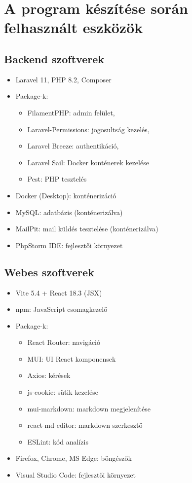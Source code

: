 \section{A program készítése során felhasznált eszközök}
\label{sec:softwares}

\subsection{Backend szoftverek}

\begin{itemize}
    \item Laravel 11, PHP 8.2, Composer
    \item Package-k: 
    \begin{itemize}
        \item FilamentPHP: admin felület,
        \item Laravel-Permissions: jogosultság kezelés,
        \item Laravel Breeze: authentikáció,
        \item Laravel Sail: Docker konténerek kezelése
        \item Pest: PHP tesztelés
    \end{itemize}
    \item Docker (Desktop): konténerizáció
    \item MySQL: adatbázis (konténerizálva)
    \item MailPit: mail küldés tesztelése (konténerizálva)
    \item PhpStorm IDE: fejlesztői környezet
\end{itemize}

\subsection{Webes szoftverek}

\begin{itemize}
    \item Vite 5.4 + React 18.3 (JSX)
    \item npm: JavaScript csomagkezelő
    \item Package-k: 
    \begin{itemize}
        \item React Router: navigáció
        \item MUI: UI React komponensek
        \item Axios: kérések
        \item js-cookie: sütik kezelése
        \item mui-markdown: markdown megjelenítése
        \item react-md-editor: markdown szerkesztő
        \item ESLint: kód analízis
    \end{itemize}
    \item Firefox, Chrome, MS Edge: böngészők
    \item Visual Studio Code: fejlesztői környezet
\end{itemize}